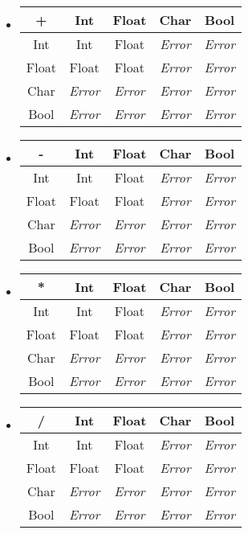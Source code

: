 \documentclass[12pt, spanish]{report}
\begin{document}
\begin{itemize}
\item
\begin{tabular}{|c||cccc|}
	\hline
+      &  Int  & Float & Char  & Bool  \\
	\hline \hline
Int    & Int   & Float & \emph{Error} & \emph{Error} \\
Float  & Float & Float & \emph{Error} & \emph{Error} \\
Char   & \emph{Error} & \emph{Error} & \emph{Error} & \emph{Error} \\
Bool   & \emph{Error} & \emph{Error} & \emph{Error} & \emph{Error} \\
	\hline
\end{tabular}

\item
\begin{tabular}{|c||cccc|}
	\hline
-      &  Int  & Float & Char  & Bool  \\
	\hline \hline
Int    & Int   & Float & \emph{Error} & \emph{Error} \\
Float  & Float & Float & \emph{Error} & \emph{Error} \\
Char   & \emph{Error} & \emph{Error} & \emph{Error} & \emph{Error} \\
Bool   & \emph{Error} & \emph{Error} & \emph{Error} & \emph{Error} \\
	\hline
\end{tabular}

\item
\begin{tabular}{|c||cccc|}
	\hline
*      &  Int  & Float & Char  & Bool  \\
	\hline \hline
Int    &  Int         & Float & \emph{Error} & \emph{Error} \\
Float  & Float        & Float & \emph{Error} & \emph{Error} \\
Char   & \emph{Error} & \emph{Error} & \emph{Error} & \emph{Error} \\
Bool   & \emph{Error} & \emph{Error} & \emph{Error} & \emph{Error} \\
	\hline
\end{tabular}

\item
\begin{tabular}{|c||cccc|}
	\hline
/      &  Int  & Float & Char  & Bool  \\
	\hline \hline
Int    &  Int  & Float & \emph{Error} & \emph{Error} \\
Float  & Float & Float & \emph{Error} & \emph{Error} \\
Char   & \emph{Error} & \emph{Error} & \emph{Error} & \emph{Error} \\
Bool   & \emph{Error} & \emph{Error} & \emph{Error} & \emph{Error} \\
	\hline
\end{tabular}


\end{itemize}
\end{document}
